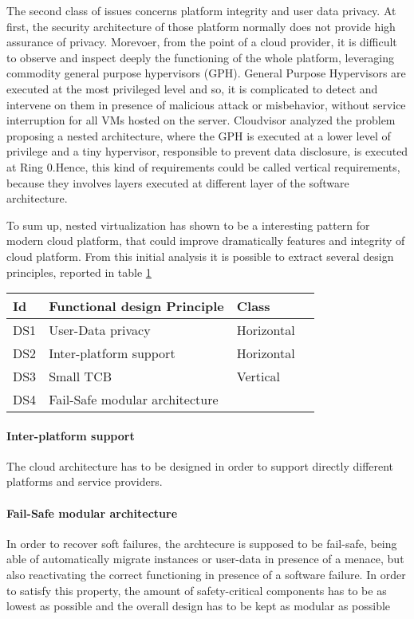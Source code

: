\documentclass{acm_proc_article-sp} %
\begin{document}
The second class of issues concerns platform integrity and user data privacy. At first, the security architecture of those platform normally does not provide high assurance of privacy. Morevoer, from the point of a cloud provider, it is difficult to observe and inspect deeply the functioning of the whole platform, leveraging commodity general purpose hypervisors (GPH).
General Purpose Hypervisors are executed at the most privileged level and so, it is complicated to detect and intervene on them in presence of malicious attack or misbehavior, without service interruption for all VMs hosted on the server. Cloudvisor \cite{cloudvisor:zhang} analyzed the problem proposing a nested architecture, where the GPH is executed at a lower level of privilege and a tiny hypervisor, responsible to prevent data disclosure, is executed at Ring 0.Hence, this kind of requirements could be called vertical requirements, because they involves layers executed at different layer of the software architecture.

To sum up, nested virtualization has shown to be a interesting pattern for modern cloud platform, that could improve dramatically features and integrity of cloud platform. From this initial analysis it is possible to extract several design principles, reported in table \ref{int:des}

\begin{table}
\label{int:des}
\begin{tabular}{llll}
\toprule
Id & Functional design Principle & Class &\\
\midrule
   DS1 & User-Data privacy & Horizontal & \\
   DS2 & Inter-platform support & Horizontal & \\
   DS3 & Small TCB & Vertical & \\
   DS4 & Fail-Safe modular architecture &  & \\
\bottomrule
      \end{tabular}
\end{table}

\paragraph{Inter-platform support} The cloud architecture has to be designed in order to support directly different platforms and service providers. 
\paragraph{Fail-Safe modular architecture} In order to recover soft failures, the archtecure is supposed to be fail-safe, being able of automatically migrate instances or user-data in presence of a menace, but also reactivating the correct functioning in presence of a software failure. In order to satisfy this property, the amount of safety-critical components has to be as lowest as possible and the overall design has to be kept as modular as possible
\end{document}
